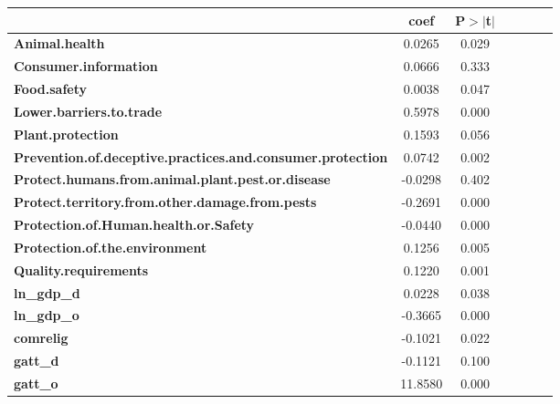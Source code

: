 \begin{table}[ht]
\begin{center}
\begin{tabular}{lcccccc}
                                                                   & \textbf{coef} & \textbf{P$> |$t$|$}\\
\midrule
\textbf{Animal.health}                                             &       0.0265  &         0.029       \\
\textbf{Consumer.information}                                      &       0.0666  &         0.333       \\
\textbf{Food.safety}                                               &       0.0038  &         0.047       \\
\textbf{Lower.barriers.to.trade}                                   &       0.5978  &         0.000       \\
\textbf{Plant.protection}                                          &       0.1593  &         0.056       \\
\textbf{Prevention.of.deceptive.practices.and.consumer.protection} &       0.0742  &         0.002       \\
\textbf{Protect.humans.from.animal.plant.pest.or.disease}          &      -0.0298  &         0.402       \\
\textbf{Protect.territory.from.other.damage.from.pests}            &      -0.2691  &         0.000       \\
\textbf{Protection.of.Human.health.or.Safety}                      &      -0.0440  &         0.000       \\
\textbf{Protection.of.the.environment}                             &       0.1256  &         0.005       \\
\textbf{Quality.requirements}                                      &       0.1220  &         0.001       \\
\textbf{ln\_gdp\_d}                                                &       0.0228  &         0.038       \\
\textbf{ln\_gdp\_o}                                                &      -0.3665  &         0.000       \\
\textbf{comrelig}                                                  &      -0.1021  &         0.022       \\
\textbf{gatt\_d}                                                   &      -0.1121  &         0.100       \\
\textbf{gatt\_o}                                                   &      11.8580  &         0.000       \\

\end{tabular}
\end{center}
\end{table}
